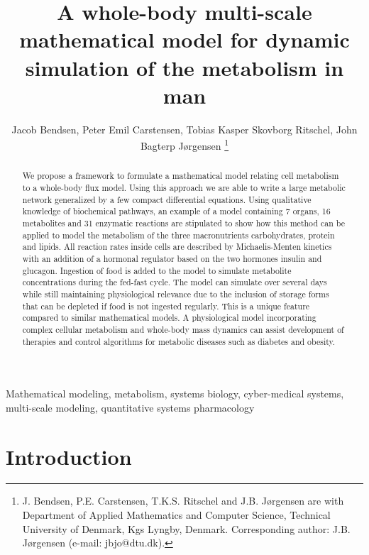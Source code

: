 \documentclass{IEEEtran}
\begin{document}
\title{A whole-body multi-scale mathematical model for dynamic simulation of the metabolism in man}

\author{Jacob Bendsen, Peter Emil Carstensen, Tobias Kasper Skovborg Ritschel, John Bagterp Jørgensen
\thanks{J. Bendsen, P.E. Carstensen, T.K.S. Ritschel and J.B. J{\o}rgensen are with Department of Applied Mathematics and Computer Science, Technical University of Denmark, Kgs Lyngby, Denmark. Corresponding author: J.B. J{\o}rgensen (e-mail: jbjo@dtu.dk).}
}

\maketitle

\begin{abstract}
We propose a framework to formulate a mathematical model relating cell metabolism to a whole-body flux model. Using this approach we are able to write a large metabolic network generalized by a few compact differential equations. Using qualitative knowledge of biochemical pathways, an example of a model containing 7 organs, 16 metabolites and 31 enzymatic reactions are stipulated to show how this method can be applied to model the metabolism of the three macronutrients carbohydrates, protein and lipids. All reaction rates inside cells are described by Michaelis-Menten kinetics with an addition of a hormonal regulator based on the two hormones insulin and glucagon.  Ingestion of food is added to the model to simulate metabolite concentrations during the fed-fast cycle. The model can simulate over several days while still maintaining physiological relevance due to the inclusion of storage forms that can be depleted if food is not ingested regularly. This is a unique feature compared to similar mathematical models. A physiological model incorporating complex cellular metabolism and whole-body mass dynamics can assist development of therapies and control algorithms for metabolic diseases such as diabetes and obesity.
\end{abstract}

\begin{IEEEkeywords}
Mathematical modeling, metabolism, systems biology, cyber-medical systems, multi-scale modeling, quantitative systems pharmacology

\end{IEEEkeywords}

\section{Introduction}
\label{sec:introduction}
\end{document}

